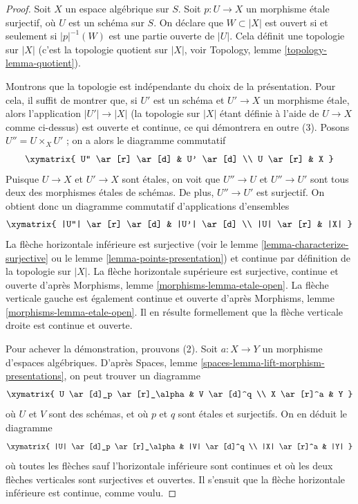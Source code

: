 \begin{proof}
Soit $X$ un espace algébrique sur $S$. Soit $p : U \to X$ un
morphisme étale surjectif, où $U$ est un schéma sur $S$.
On déclare que $W \subset |X|$ est ouvert si et seulement si $|p|^{-1}(W)$
est une partie ouverte de $|U|$. Cela définit une topologie sur $|X|$
(c'est la topologie quotient sur $|X|$, voir
Topology, lemme \ref{topology-lemma-quotient}).

\medskip\noindent
Montrons que la topologie est indépendante du choix de
la présentation. Pour cela, il suffit de montrer que, si $U'$ est un schéma
et $U' \to X$ un morphisme étale, alors l'application $|U'| \to |X|$
(la topologie sur $|X|$ étant définie à l'aide de $U \to X$ comme ci-dessus)
est ouverte et continue, ce qui démontrera en outre (3).
Posons $U'' = U \times_X U'$ ; on a alors le diagramme commutatif
$$
\xymatrix{
U'' \ar[r] \ar[d] & U' \ar[d] \\
U \ar[r] & X
}
$$
Puisque $U \to X$ et $U' \to X$ sont étales, on voit que
$U'' \to U$ et $U'' \to U'$ sont tous deux des morphismes étales de schémas.
De plus, $U'' \to U'$ est surjectif. On obtient donc
un diagramme commutatif d'applications d'ensembles
$$
\xymatrix{
|U''| \ar[r] \ar[d] & |U'| \ar[d] \\
|U| \ar[r] & |X|
}
$$
La flèche horizontale inférieure est surjective (voir le
lemme \ref{lemma-characterize-surjective}
ou le
lemme \ref{lemma-points-presentation})
et continue par définition de la topologie sur $|X|$.
La flèche horizontale supérieure est surjective, continue et ouverte d'après
Morphisms, lemme \ref{morphisms-lemma-etale-open}.
La flèche verticale gauche est également continue et ouverte d'après
Morphisms, lemme \ref{morphisms-lemma-etale-open}.
Il en résulte formellement que la flèche verticale droite
est continue et ouverte.

\medskip\noindent
Pour achever la démonstration, prouvons (2).
Soit $a : X \to Y$ un morphisme d'espaces algébriques. D'après
Spaces, lemme \ref{spaces-lemma-lift-morphism-presentations},
on peut trouver un diagramme
$$
\xymatrix{
U \ar[d]_p \ar[r]_\alpha & V \ar[d]^q \\
X \ar[r]^a & Y
}
$$
où $U$ et $V$ sont des schémas, et où $p$ et $q$ sont étales et surjectifs.
On en déduit le diagramme
$$
\xymatrix{
|U| \ar[d]_p \ar[r]_\alpha & |V| \ar[d]^q \\
|X| \ar[r]^a & |Y|
}
$$
où toutes les flèches sauf l'horizontale inférieure sont continues et
où les deux flèches verticales sont surjectives et ouvertes. Il s'ensuit que la
flèche horizontale inférieure est continue, comme voulu.
\end{proof}

